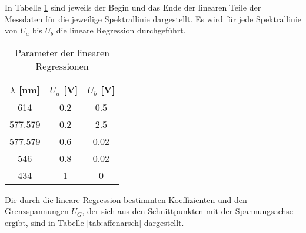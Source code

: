   In Tabelle \ref{tab:hirntoter} sind jeweils der Begin und das Ende der linearen Teile der Messdaten
  für die jeweilige Spektrallinie dargestellt. Es wird für jede Spektrallinie von $U_a$ bis $U_b$ 
  die lineare Regression durchgeführt.
  \begin{table}[H]
    \centering
    \caption{Parameter der linearen Regressionen}
    \label{tab:hirntoter}
    \begin{tabular}{c c c}
     \toprule
      $\lambda$ [nm] & $U_{a}$ [V] & $U_{b}$ [V] \\
      \midrule
      614     & -0.2 & 0.5  \\
      577.579 & -0.2 & 2.5  \\
      577.579 & -0.6 & 0.02 \\
      546     & -0.8 & 0.02 \\
      434     & -1   & 0    \\
     \bottomrule
    \end{tabular}
  \end{table} 
  Die durch die lineare Regression bestimmten Koeffizienten und den Grenzspannungen $U_G$,
  der sich aus den Schnittpunkten mit der Spannungsachse ergibt, sind in Tabelle 
  \ref{tab:affenarsch} dargestellt. 
  
